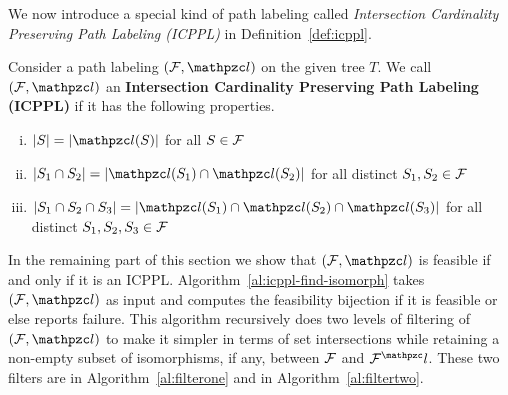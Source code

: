 We now introduce a special kind of path labeling called {\em
  Intersection Cardinality Preserving Path Labeling (ICPPL)} in
Definition~\ref{def:icppl}.

\begin{definition}
  \label{def:icppl}
  Consider a path labeling $(\cF, \cl)$ on the given tree $T$. We call
  $(\cF, \cl)$ an \textbf{Intersection Cardinality Preserving Path
    Labeling (ICPPL)} if it has the following properties.
  \par
  \parbox{\linewidth}{%
    \hangindent {}%
    \begin{enumerate}[i. ] %
      \singlespacing
    \item \label{pr:i} $|S| = |\cl(S)|$ for all $S \in {\cal F}$
    \item \label{pr:ii}$|S_1 \cap S_2| = |\cl(S_1) \cap \cl(S_2)|$ for
    all distinct $S_1, S_2 \in {\cal F}$
    \item \label{pr:iii}$|S_1 \cap S_2 \cap S_3| = |\cl(S_1) \cap
    \cl(S_2) \cap \cl(S_3)|$ for all distinct $S_1, S_2, S_3 \in {\cal F}$
    \end{enumerate}
  }
\end{definition}


In the remaining part of this section we show that $(\cF, \cl)$ is
feasible if and only if it is an ICPPL.
Algorithm~\ref{al:icppl-find-isomorph} takes $(\cF, \cl)$ as input and
computes the feasibility bijection if it is feasible or else reports
failure. This algorithm recursively does two levels of filtering of
$(\cF, \cl)$ to make it simpler in terms of set intersections while
retaining a non-empty subset of isomorphisms, if any, between ${\cal F}$
and $\cF^\cl$. These two filters are \filteri in
Algorithm~\ref{al:filterone} and \filterii in
Algorithm~\ref{al:filtertwo}.

